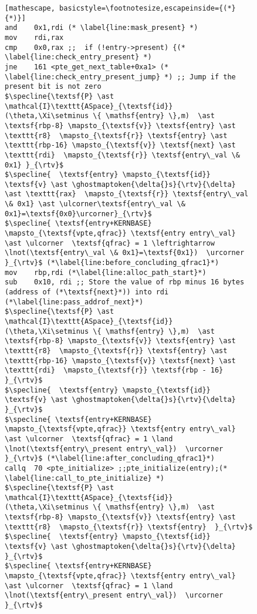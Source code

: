 \begin{figure}
\begin{lstlisting}[mathescape, basicstyle=\footnotesize,escapeinside={(*}{*)}]
and    0x1,rdi (* \label{line:mask_present} *)
mov    rdi,rax
cmp    0x0,rax ;;  if (!entry->present) {(* \label{line:check_entry_present} *)
jne    161 <pte_get_next_table+0xa1> (* \label{line:check_entry_present_jump} *) ;; Jump if the present bit is not zero
$\specline{\textsf{P} \ast \mathcal{I}\texttt{ASpace}_{\textsf{id}}(\theta,\Xi\setminus \{ \mathsf{entry} \},m)  \ast \textsf{rbp-8} \mapsto_{\textsf{v}} \textsf{entry} \ast \texttt{r8}  \mapsto_{\textsf{r}} \textsf{entry} \ast \texttt{rbp-16} \mapsto_{\textsf{v}} \textsf{next} \ast \texttt{rdi}  \mapsto_{\textsf{r}} \textsf{entry\_val \& 0x1} }_{\rtv}$
$\specline{  \textsf{entry} \mapsto_{\textsf{id}} \textsf{v} \ast \ghostmaptoken{\delta{}s}{\rtv}{\delta}  \ast \texttt{rax}  \mapsto_{\textsf{r}} \textsf{entry\_val \& 0x1} \ast \ulcorner\textsf{entry\_val \& 0x1}=\textsf{0x0}\urcorner}_{\rtv}$
$\specline{ \textsf{entry+KERNBASE} \mapsto_{\textsf{vpte,qfrac}} \textsf{entry entry\_val} \ast \ulcorner  \textsf{qfrac} = 1 \leftrightarrow  \lnot(\textsf{entry\_val \& 0x1}=\textsf{0x1})  \urcorner }_{\rtv}$ (*\label{line:before_concluding_qfrac1}*)
mov    rbp,rdi (*\label{line:alloc_path_start}*)
sub    0x10, rdi ;; Store the value of rbp minus 16 bytes (address of (*\textsf{next}*)) into rdi (*\label{line:pass_addrof_next}*)
$\specline{\textsf{P} \ast \mathcal{I}\texttt{ASpace}_{\textsf{id}}(\theta,\Xi\setminus \{ \mathsf{entry} \},m)  \ast \textsf{rbp-8} \mapsto_{\textsf{v}} \textsf{entry} \ast \texttt{r8}  \mapsto_{\textsf{r}} \textsf{entry} \ast \texttt{rbp-16} \mapsto_{\textsf{v}} \textsf{next} \ast \texttt{rdi}  \mapsto_{\textsf{r}} \textsf{rbp - 16} }_{\rtv}$
$\specline{  \textsf{entry} \mapsto_{\textsf{id}} \textsf{v} \ast \ghostmaptoken{\delta{}s}{\rtv}{\delta} }_{\rtv}$
$\specline{ \textsf{entry+KERNBASE} \mapsto_{\textsf{vpte,qfrac}} \textsf{entry entry\_val} \ast \ulcorner  \textsf{qfrac} = 1 \land \lnot(\textsf{entry\_present entry\_val})  \urcorner }_{\rtv}$ (*\label{line:after_concluding_qfrac1}*)
callq  70 <pte_initialize> ;;pte_initialize(entry);(* \label{line:call_to_pte_initialize} *)
$\specline{\textsf{P} \ast \mathcal{I}\texttt{ASpace}_{\textsf{id}}(\theta,\Xi\setminus \{ \mathsf{entry} \},m)  \ast \textsf{rbp-8} \mapsto_{\textsf{v}} \textsf{entry} \ast \texttt{r8}  \mapsto_{\textsf{r}} \textsf{entry}  }_{\rtv}$
$\specline{  \textsf{entry} \mapsto_{\textsf{id}} \textsf{v} \ast \ghostmaptoken{\delta{}s}{\rtv}{\delta} }_{\rtv}$
$\specline{ \textsf{entry+KERNBASE} \mapsto_{\textsf{vpte,qfrac}} \textsf{entry entry\_val} \ast \ulcorner  \textsf{qfrac} = 1 \land \lnot(\textsf{entry\_present entry\_val})  \urcorner }_{\rtv}$

\end{lstlisting}
\end{figure}
